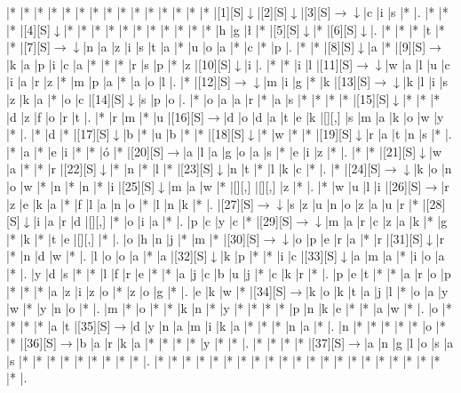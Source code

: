 \documentclass[11pt]{article}
\newcommand\drarr{$\rightarrow \!\!\!\!\! \downarrow$}
\newcommand\rarr{$\rightarrow$}
\newcommand\darr{$\downarrow$}
\begin{document}
\noindent\begin{Puzzle}{21}{24}|*	|*	|*	|*	|*	|*	|*	|*	|*	|*	|*	|*	|*	|*	|*	|[1][S]\darr	|[2][S]\darr	|[3][S]\drarr	|c	|i	|s	|*	|.
|*	|*	|*	|[4][S]\darr	|*	|*	|*	|*	|*	|*	|*	|*	|*	|*	|*	|h	|g	|ł	|*	|[5][S]\darr	|*	|[6][S]\darr	|.
|*	|*	|*	|t	|*	|*	|[7][S]\drarr	|n	|a	|z	|i	|s	|t	|a	|*	|u	|o	|a	|*	|c	|*	|p	|.
|*	|*	|[8][S]\darr	|a	|*	|[9][S]\rarr	|k	|a	|p	|i	|c	|a	|*	|*	|*	|r	|s	|p	|*	|z	|[10][S]\darr	|i	|.
|*	|*	|i	|l	|[11][S]\drarr	|w	|a	|l	|u	|c	|i	|a	|r	|z	|*	|m	|p	|a	|*	|a	|o	|l	|.
|*	|[12][S]\drarr	|m	|i	|g	|*	|k	|[13][S]\drarr	|k	|l	|i	|s	|z	|k	|a	|*	|o	|c	|[14][S]\darr	|s	|p	|o	|.
|*	|o	|a	|a	|r	|*	|a	|s	|*	|*	|*	|*	|[15][S]\darr	|*	|*	|*	|d	|z	|f	|o	|r	|t	|.
|*	|r	|m	|*	|u	|[16][S]\rarr	|d	|o	|d	|a	|t	|e	|k	|[][,]{ }	|s	|m	|a	|k	|o	|w	|y	|*	|.
|*	|d	|*	|[17][S]\darr	|b	|*	|u	|b	|*	|*	|[18][S]\darr	|*	|w	|*	|*	|[19][S]\darr	|r	|a	|t	|n	|s	|*	|.
|*	|a	|*	|e	|i	|*	|*	|ó	|*	|[20][S]\rarr	|a	|l	|a	|g	|o	|a	|s	|*	|e	|i	|z	|*	|.
|*	|*	|[21][S]\darr	|w	|a	|*	|*	|r	|[22][S]\darr	|*	|n	|*	|l	|*	|[23][S]\darr	|n	|t	|*	|l	|k	|c	|*	|.
|*	|[24][S]\drarr	|k	|o	|n	|o	|w	|*	|n	|*	|n	|*	|i	|[25][S]\darr	|m	|a	|w	|*	|[][,]{ }	|[][,]{ }	|z	|*	|.
|*	|w	|u	|l	|i	|[26][S]\rarr	|r	|z	|e	|k	|a	|*	|f	|l	|a	|n	|o	|*	|l	|n	|k	|*	|.
|[27][S]\drarr	|s	|z	|u	|n	|o	|z	|a	|u	|r	|*	|[28][S]\darr	|i	|a	|r	|d	|[][,]{ }	|*	|o	|i	|a	|*	|.
|p	|c	|y	|c	|*	|[29][S]\drarr	|m	|a	|r	|c	|z	|a	|k	|*	|g	|*	|k	|*	|t	|e	|[][,]{ }	|*	|.
|o	|h	|n	|j	|*	|m	|*	|[30][S]\drarr	|o	|p	|e	|r	|a	|*	|r	|[31][S]\darr	|r	|*	|n	|d	|w	|*	|.
|l	|o	|o	|a	|*	|a	|[32][S]\darr	|k	|p	|*	|*	|i	|c	|[33][S]\darr	|a	|m	|a	|*	|i	|o	|a	|*	|.
|y	|d	|s	|*	|*	|l	|f	|r	|e	|*	|*	|a	|j	|c	|b	|u	|j	|*	|c	|k	|r	|*	|.
|p	|e	|t	|*	|*	|a	|r	|o	|p	|*	|*	|*	|a	|z	|i	|z	|o	|*	|z	|o	|g	|*	|.
|e	|k	|w	|*	|[34][S]\rarr	|k	|o	|k	|t	|a	|j	|l	|*	|o	|a	|y	|w	|*	|y	|n	|o	|*	|.
|m	|*	|o	|*	|*	|k	|n	|*	|y	|*	|*	|*	|*	|p	|n	|k	|e	|*	|*	|a	|w	|*	|.
|o	|*	|*	|*	|*	|a	|t	|[35][S]\rarr	|d	|y	|n	|a	|m	|i	|k	|a	|*	|*	|*	|n	|a	|*	|.
|n	|*	|*	|*	|*	|*	|o	|*	|*	|[36][S]\rarr	|b	|a	|r	|k	|a	|*	|*	|*	|*	|y	|*	|*	|.
|*	|*	|*	|*	|[37][S]\rarr	|a	|n	|g	|l	|o	|s	|a	|s	|*	|*	|*	|*	|*	|*	|*	|*	|*	|.
|*	|*	|*	|*	|*	|*	|*	|*	|*	|*	|*	|*	|*	|*	|*	|*	|*	|*	|*	|*	|*	|*	|.\end{Puzzle}

\newpage
\end{document}
